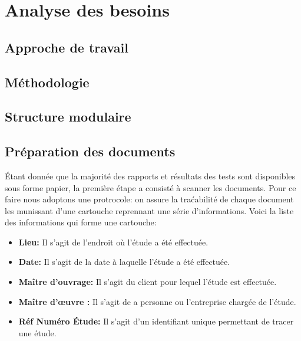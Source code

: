 \chapter{Analyse des besoins}
        
                \lipsum[1]
        \section{Approche de travail}
                \lipsum[1]
        \section{Méthodologie}
                \lipsum[1]
        \section{Structure modulaire}
                \lipsum[1]
        \section{Préparation des documents}
                \par
                Étant donnée que la majorité des rapports et résultats des tests sont 
                disponibles sous forme papier, la première étape a consisté à scanner les documents.
                Pour ce faire nous adoptons une protrocole: on assure la traćabilité de chaque 
                document les munissant d'une cartouche reprennant une série d'informations.
                Voici la liste des informations qui forme une cartouche:
                \begin{itemize}
                        \item \textbf{Lieu: }
                        Il s'agit de l'endroit où l'étude a été effectuée.
                        \item \textbf{Date: }
                        Il s'agit de la date à laquelle l'étude a été effectuée.
                        \item \textbf{Maître d'ouvrage: }
                        Il s'agit du client pour lequel l'étude est effectuée.
                        \item \textbf{Maître d'œuvre : }
                        Il s'agit de a personne ou l'entreprise chargée de l'étude.
                        \item \textbf{Réf Numéro Étude: }
                        Il s'agit d'un identifiant unique permettant de tracer une étude.
                \end{itemize}
                
